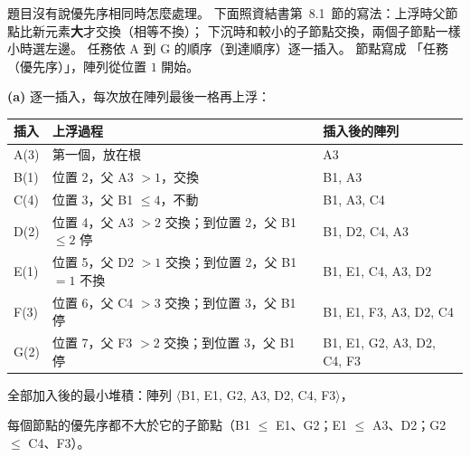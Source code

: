 \begin{pastsoln}
題目沒有說優先序相同時怎麼處理。 下面照資結書第~8.1~節的寫法：上浮時父節點比新元素\textbf{大}才交換（相等不換）；
下沉時和較小的子節點交換，兩個子節點一樣小時選左邊。 任務依 A 到 G 的順序（到達順序）逐一插入。 節點寫成
「任務（優先序）」，陣列從位置 $1$ 開始。

\textbf{(a)} 逐一插入，每次放在陣列最後一格再上浮：
\begin{center}
\small
\begin{tabular}{lll}
\toprule
插入 & 上浮過程 & 插入後的陣列 \\
\midrule
A(3) & 第一個，放在根 & A3 \\
B(1) & 位置 2，父 A3 $> 1$，交換 & B1, A3 \\
C(4) & 位置 3，父 B1 $\le 4$，不動 & B1, A3, C4 \\
D(2) & 位置 4，父 A3 $> 2$ 交換；到位置 2，父 B1 $\le 2$ 停 & B1, D2, C4, A3 \\
E(1) & 位置 5，父 D2 $> 1$ 交換；到位置 2，父 B1 $= 1$ 不換 & B1, E1, C4, A3, D2 \\
F(3) & 位置 6，父 C4 $> 3$ 交換；到位置 3，父 B1 停 & B1, E1, F3, A3, D2, C4 \\
G(2) & 位置 7，父 F3 $> 2$ 交換；到位置 3，父 B1 停 & B1, E1, G2, A3, D2, C4, F3 \\
\bottomrule
\end{tabular}
\end{center}
全部加入後的最小堆積：陣列 $\langle$B1, E1, G2, A3, D2, C4, F3$\rangle$，
\begin{center}
\end{center}
每個節點的優先序都不大於它的子節點（B1 $\le$ E1、G2；E1 $\le$ A3、D2；G2 $\le$ C4、F3）。


\end{pastsoln}
